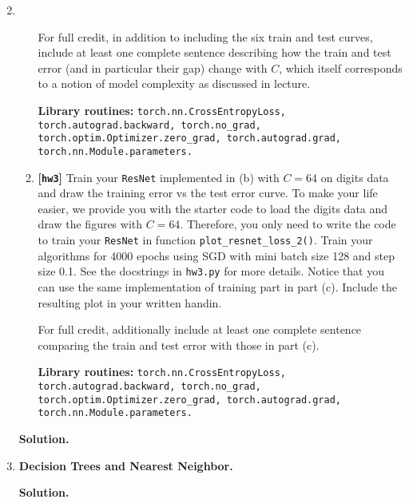\documentclass{article}
\def\hw{\textbf{[\texttt{hw3}]}\xspace}
\theoremstyle{definition}
\theoremstyle{remark}
\newenvironment{Q}
{%
\clearpage
\item
}
{%
\phantom{s} %
\bigskip
\textbf{Solution.}
}
\begin{document}
\begin{enumerate}[font={\Large\bfseries},left=0pt]
\begin{Q}
\begin{enumerate}
          For full credit, in addition to including the six train and test curves,
          include at least one complete sentence describing how the train and test error (and in particular their gap) change with $C$, which itself corresponds to a notion of model complexity as discussed in lecture.
        
         \textbf{Library routines:} \texttt{torch.nn.CrossEntropyLoss, torch.autograd.backward, torch.no\_grad, torch.optim.Optimizer.zero\_grad, torch.autograd.grad, torch.nn.Module.parameters.}
         
     \item \hw
         Train your \texttt{ResNet} implemented in (b) with $C=64$ on digits data and draw the training error vs the test error curve. To make your life easier, we provide you with the starter code to load the digits data and draw the figures with $C=64$. Therefore, you only need to write the code to train your \texttt{ResNet} in  function \texttt{plot\_resnet\_loss\_2()}. Train your algorithms for 4000 epochs using SGD with mini batch size 128 and step size 0.1. See the docstrings in \texttt{hw3.py} for more details. Notice that you can use the same implementation of training part in part (c). Include the resulting plot in your written handin. 
                
         For full credit, additionally include at least one complete sentence comparing the train and test error with those in part (c).
         
         \textbf{Library routines:} \texttt{torch.nn.CrossEntropyLoss, torch.autograd.backward, torch.no\_grad, torch.optim.Optimizer.zero\_grad, torch.autograd.grad, torch.nn.Module.parameters.}
    \end{enumerate}
\end{Q}

   
          \begin{Q}
             \textbf{\Large Decision Trees and Nearest Neighbor.}
             

\end{Q}
\end{enumerate}
\end{document}
